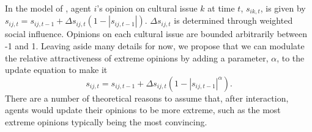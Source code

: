 \documentclass[a4paper,12pt]{article}
\begin{document}

In the model of ,
agent $i$'s opinion on cultural issue $k$ at time $t$, $s_{ik,t}$, 
is given by $s_{ij,t} = s_{ij,t-1} + \Delta s_{ij,t} \left ( 1 - |s_{ij,t-1}| \right )$.
$\Delta s_{ij,t}$ is determined through weighted social influence. Opinions on
each cultural issue are bounded arbitrarily between -1 and 1. Leaving aside
many details for now, we propose that we can modulate the relative attractiveness
of extreme opinions by adding a parameter, $\alpha$, to the update equation
to make it 
\[
  s_{ij,t} = s_{ij,t-1} + \Delta s_{ij,t} \left ( 1 - |s_{ij,t-1}|^{\alpha} \right ).
\]
There are a number of theoretical reasons to assume that, after interaction,
agents would update their opinions to be more extreme, such as the most
extreme opinions typically being the most convincing.
\end{document}
